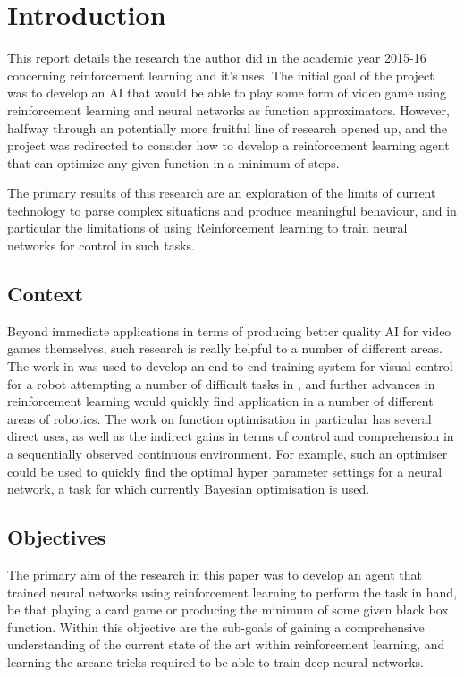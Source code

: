 \section{Introduction}
This report details the research the author did in the academic year 2015-16 concerning reinforcement learning and it's uses. The initial goal of the project was to develop an AI that would be able to play some form of video game using reinforcement learning and neural networks as function approximators. However, halfway through an potentially more fruitful line of research opened up, and the project was redirected to consider how to develop a reinforcement learning agent that can optimize any given function in a minimum of steps.

The primary results of this research are an exploration of the limits of current technology to parse complex situations and produce meaningful behaviour, and in particular the limitations of using Reinforcement learning to train neural networks for control in such tasks.

\subsection{Context}
Beyond immediate applications in terms of producing better quality AI for video games themselves, such research is really helpful to a number of different areas. The work in \cite{atariDQN} was used to develop an end to end training system for visual control for a robot attempting a number of difficult tasks in \cite{levine2015end}, and further advances in reinforcement learning would quickly find application in a number of different areas of robotics. The work on function optimisation in particular has several direct uses, as well as the indirect gains in terms of control and comprehension in a sequentially observed continuous environment. For example, such an optimiser could be used to quickly find the optimal hyper parameter settings for  a neural network, a task for which currently Bayesian optimisation is used.

\subsection{Objectives}
The primary aim of the research in this paper was to develop an agent that trained neural networks using reinforcement learning to perform the task in hand, be that playing a card game or producing the minimum of some given black box function. Within this objective are the sub-goals of gaining a comprehensive understanding of the current state of the art within reinforcement learning, and learning the arcane tricks required to be able to train deep neural networks.

